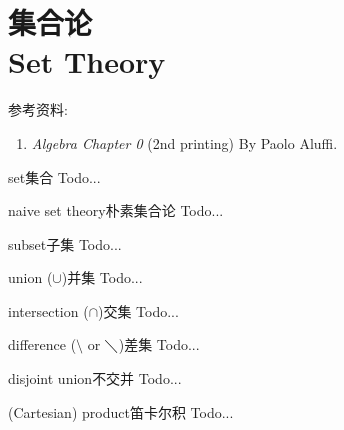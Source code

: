 \section{集合论 \\Set Theory}

参考资料:
\begin{enumerate}
	\item \textit{Algebra Chapter 0} (2nd printing) By Paolo Aluffi.
\end{enumerate}

\begin{defbox}{set}{集合}
	Todo...
\end{defbox}

\begin{defbox}{naive set theory}{朴素集合论}
	Todo...
\end{defbox}

\begin{defbox}{subset}{子集}
	Todo...
\end{defbox}

\begin{defbox}{union ($\cup$)}{并集}
	Todo...
\end{defbox}

\begin{defbox}{intersection ($\cap$)}{交集}
	Todo...
\end{defbox}

\begin{defbox}{difference ($\setminus$ or $\diagdown $)}{差集}
	Todo...
\end{defbox}

\begin{defbox}{disjoint union}{不交并}
	Todo...
\end{defbox}

\begin{defbox}{(Cartesian) product}{笛卡尔积}
	Todo...
\end{defbox}